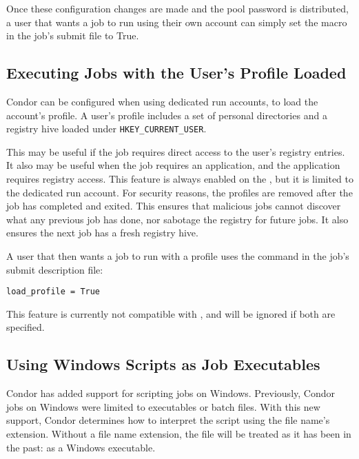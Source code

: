 Once these configuration changes are made and the pool password is
distributed, a user that wants a job to run using their own account
can simply set the  macro in the job's
submit file to True.

\subsection{\label{sec:windows-load-profile}Executing Jobs with the User's Profile Loaded}
Condor can be configured when using dedicated run accounts, 
to load the account's profile.  A user's profile includes a set of personal 
directories and a registry hive loaded under \texttt{HKEY\_CURRENT\_USER}.

This may be useful if the job requires direct access to the user's registry 
entries.
It also may be useful when the job requires an application, 
and the application requires registry access. 
This feature is always enabled on the , 
but it is limited to the dedicated run account.
For security reasons, the profiles are
removed after the job has completed and exited.  
This ensures 
that malicious jobs cannot discover what any previous job has done, nor 
sabotage the registry for future jobs. It also ensures the next job has 
a fresh registry hive.

A user that then wants a job to run with a profile uses the
 command in the job's submit description file:
\begin{verbatim}
load_profile = True
\end{verbatim}

This feature is currently not compatible with , 
and will be ignored if both are specified.

\subsection{\label{sec:windows-scripts-as-executables}Using Windows Scripts as Job Executables}

Condor has added support for scripting jobs on Windows.
Previously, Condor jobs on Windows were limited to executables or batch files.
With this new support,
Condor determines how to interpret the script using 
the file name's extension.
Without a file name extension, 
the file will be treated as it has been in the past:
as a Windows executable.

